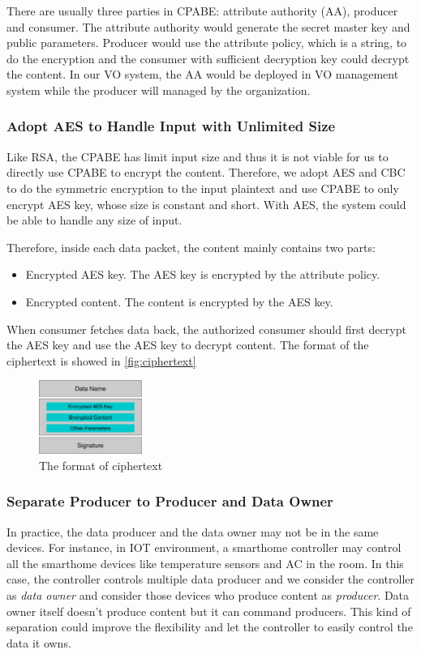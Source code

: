 There are usually three parties in CPABE: attribute authority (AA), producer and consumer.
The attribute authority would generate the secret master key and public parameters.
Producer would use the attribute policy, which is a string, to do the encryption and the consumer with sufficient decryption key could decrypt the content.
In our VO system, the AA would be deployed in VO management system while the producer will managed by the organization.

\subsubsection{Adopt AES to Handle Input with Unlimited Size}
Like RSA, the CPABE has limit input size and thus it is not viable for us to directly use CPABE to encrypt the content.
Therefore, we adopt AES and CBC to do the symmetric encryption to the input plaintext and use CPABE to only encrypt AES key, whose size is constant and short.
With AES, the system could be able to handle any size of input.

Therefore, inside each data packet, the content mainly contains two parts:
\begin{itemize}
\item Encrypted AES key. The AES key is encrypted by the attribute policy.
\item Encrypted content. The content is encrypted by the AES key.
\end{itemize}
When consumer fetches data back, the authorized consumer should first decrypt the AES key and use the AES key to decrypt content.
The format of the ciphertext is showed in \ref{fig:ciphertext}

\begin{figure}[H]
  \centering
  \includegraphics[width=0.3\textwidth]{figures/ciphertext}
  \vspace{-3mm}
  \caption{The format of ciphertext}
  \label{fig:token}
\end{figure}

\subsubsection{Separate Producer to Producer and Data Owner}
In practice, the data producer and the data owner may not be in the same devices.
For instance, in IOT environment, a smarthome controller may control all the smarthome devices like temperature sensors and AC in the room.
In this case, the controller controls multiple data producer and we consider the controller as \textit{data owner} and consider those devices who produce content as \textit{producer}.
Data owner itself doesn't produce content but it can command producers.
This kind of separation could improve the flexibility and let the controller to easily control the data it owns.

